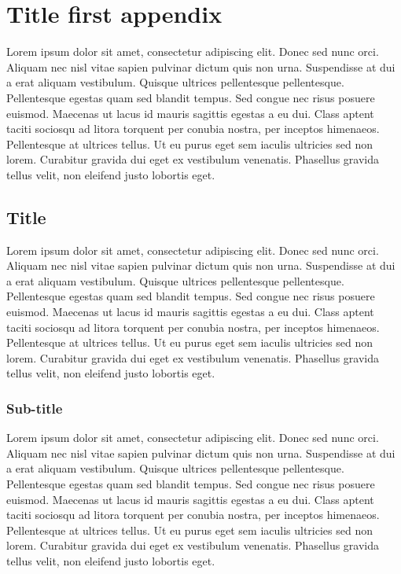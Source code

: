 \chapter{Title first appendix}

Lorem ipsum dolor sit amet, consectetur adipiscing elit. Donec sed nunc orci. Aliquam nec nisl vitae sapien pulvinar dictum quis non urna. Suspendisse at dui a erat aliquam vestibulum. Quisque ultrices pellentesque pellentesque. Pellentesque egestas quam sed blandit tempus. Sed congue nec risus posuere euismod. Maecenas ut lacus id mauris sagittis egestas a eu dui. Class aptent taciti sociosqu ad litora torquent per conubia nostra, per inceptos himenaeos. Pellentesque at ultrices tellus. Ut eu purus eget sem iaculis ultricies sed non lorem. Curabitur gravida dui eget ex vestibulum venenatis. Phasellus gravida tellus velit, non eleifend justo lobortis eget. 

\section{Title}
Lorem ipsum dolor sit amet, consectetur adipiscing elit. Donec sed nunc orci. Aliquam nec nisl vitae sapien pulvinar dictum quis non urna. Suspendisse at dui a erat aliquam vestibulum. Quisque ultrices pellentesque pellentesque. Pellentesque egestas quam sed blandit tempus. Sed congue nec risus posuere euismod. Maecenas ut lacus id mauris sagittis egestas a eu dui. Class aptent taciti sociosqu ad litora torquent per conubia nostra, per inceptos himenaeos. Pellentesque at ultrices tellus. Ut eu purus eget sem iaculis ultricies sed non lorem. Curabitur gravida dui eget ex vestibulum venenatis. Phasellus gravida tellus velit, non eleifend justo lobortis eget. 

\subsection{Sub-title}
Lorem ipsum dolor sit amet, consectetur adipiscing elit. Donec sed nunc orci. Aliquam nec nisl vitae sapien pulvinar dictum quis non urna. Suspendisse at dui a erat aliquam vestibulum. Quisque ultrices pellentesque pellentesque. Pellentesque egestas quam sed blandit tempus. Sed congue nec risus posuere euismod. Maecenas ut lacus id mauris sagittis egestas a eu dui. Class aptent taciti sociosqu ad litora torquent per conubia nostra, per inceptos himenaeos. Pellentesque at ultrices tellus. Ut eu purus eget sem iaculis ultricies sed non lorem. Curabitur gravida dui eget ex vestibulum venenatis. Phasellus gravida tellus velit, non eleifend justo lobortis eget. 
